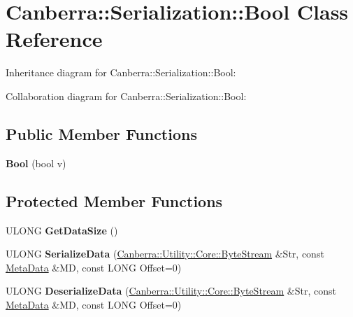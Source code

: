 \hypertarget{class_canberra_1_1_serialization_1_1_bool}{}\section{Canberra\+:\+:Serialization\+:\+:Bool Class Reference}
\label{class_canberra_1_1_serialization_1_1_bool}


Inheritance diagram for Canberra\+:\+:Serialization\+:\+:Bool\+:


Collaboration diagram for Canberra\+:\+:Serialization\+:\+:Bool\+:
\subsection*{Public Member Functions}
\begin{DoxyCompactItemize}
\item 
\mbox{\label{class_canberra_1_1_serialization_1_1_bool_aba20972f341496d1e14945482772cbfd}} 
{\bfseries Bool} (bool v)
\end{DoxyCompactItemize}
\subsection*{Protected Member Functions}
\begin{DoxyCompactItemize}
\item 
\mbox{\label{class_canberra_1_1_serialization_1_1_bool_a2f680c0031a0c9b74612d52667527ddd}} 
U\+L\+O\+NG {\bfseries Get\+Data\+Size} ()
\item 
\mbox{\label{class_canberra_1_1_serialization_1_1_bool_af44074b66b85b99a1b805fbd7a0498ba}} 
U\+L\+O\+NG {\bfseries Serialize\+Data} (\hyperlink{class_canberra_1_1_utility_1_1_core_1_1_byte_stream}{Canberra\+::\+Utility\+::\+Core\+::\+Byte\+Stream} \&Str, const \hyperlink{class_canberra_1_1_serialization_1_1_meta_data}{Meta\+Data} \&MD, const L\+O\+NG Offset=0)
\item 
\mbox{\label{class_canberra_1_1_serialization_1_1_bool_a7bfad52be577ba861dbcc41b10f3dedd}} 
U\+L\+O\+NG {\bfseries Deserialize\+Data} (\hyperlink{class_canberra_1_1_utility_1_1_core_1_1_byte_stream}{Canberra\+::\+Utility\+::\+Core\+::\+Byte\+Stream} \&Str, const \hyperlink{class_canberra_1_1_serialization_1_1_meta_data}{Meta\+Data} \&MD, const L\+O\+NG Offset=0)
\end{DoxyCompactItemize}
